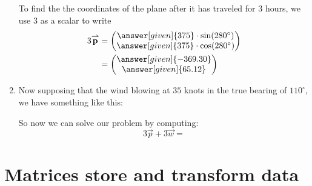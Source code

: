 \documentclass{ximera}
\begin{document}
\begin{example}[Navigation]
\begin{solution}
\begin{enumerate}
To find the the coordinates of the plane after it has traveled for $3$
hours, we use $3$ as a scalar to write
\begin{align*}
  3\vec{p} &= \begin{pmatrix}\answer[given]{375}\cdot \sin(280^\circ)\\ \answer[given]{375} \cdot \cos(280^\circ)\end{pmatrix}\\
  &= \begin{pmatrix}\answer[given]{-369.30}\\ \answer[given]{65.12} \end{pmatrix}\\
\end{align*}
\item Now supposing that the wind blowing at $35$ knots in the true
  bearing of $110^\circ$, we have something like this:
  \begin{center}
  \end{center}
  So now we can solve our problem by computing:
  \[
  3\vec{p} + 3 \vec{w} =
  \]
\end{enumerate}
\end{solution}
\end{example}



\section{Matrices store and transform data}
\end{document}
